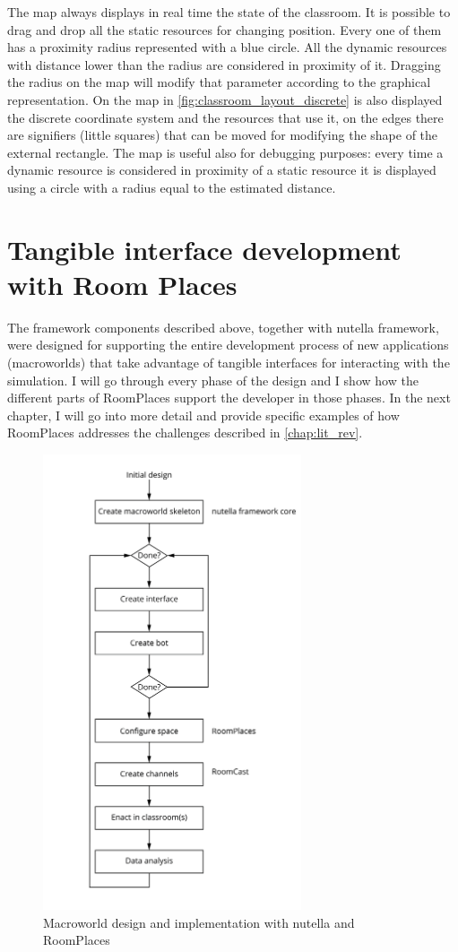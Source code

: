 The map always displays in real time the state of the classroom. It is possible to drag and drop all the static resources for changing position. Every one of them has a proximity radius represented with a blue circle. All the dynamic resources with distance lower than the radius are considered in proximity of it. Dragging the radius on the map will modify that parameter according to the graphical representation. On the map in \ref{fig:classroom_layout_discrete} is also displayed the discrete coordinate system and the resources that use it, on the edges there are signifiers (little squares) that can be moved for modifying the shape of the external rectangle. The map is useful also for debugging purposes: every time a dynamic resource is considered in proximity of a static resource it is displayed using a circle with a radius equal to the estimated distance. 

\section{Tangible interface development with Room Places}
The framework components described above, together with nutella framework, were designed for supporting the entire development process of new applications (macroworlds) that take advantage of tangible interfaces for interacting with the simulation. I will go through every phase of the design and I show how the different parts of RoomPlaces support the developer in those phases. In the next chapter, I will go into more detail and provide specific examples of how RoomPlaces addresses the challenges described in \autoref{chap:lit_rev}.

\begin{figure}
\centering
\includegraphics[width=3in]{images/nutella_workflow.png}
\caption{Macroworld design and implementation with nutella and RoomPlaces}
\label{fig:nutella_workflow}
\end{figure}

